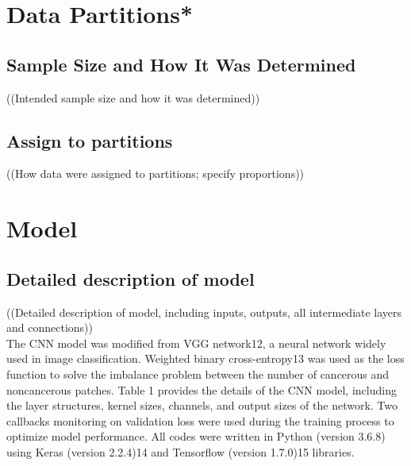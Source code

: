 \section{Data Partitions*}
\subsection{Sample Size and How It Was Determined}
((Intended sample size and how it was determined))
\subsection{Assign to partitions}
((How data were assigned to partitions; specify proportions))


\section{Model}
\subsection{Detailed description of model}
((Detailed description of model, including inputs, outputs, all intermediate layers and connections)) \\

The CNN model was modified from VGG network12, a neural network widely used in image classification. Weighted binary cross-entropy13 was used as the loss function to solve the  imbalance problem between the number of cancerous and noncancerous patches. Table 1 provides the details of the CNN model, including the layer structures, kernel sizes, channels, and output sizes of the network.
Two callbacks monitoring on validation loss were used during the training process to optimize model performance. All codes were written in Python (version 3.6.8) using Keras (version 2.2.4)14 and Tensorflow (version 1.7.0)15 libraries.

